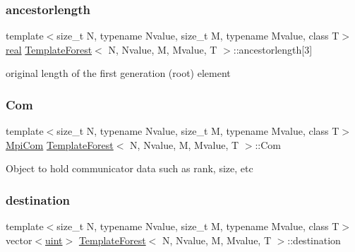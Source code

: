 \subsubsection{\texorpdfstring{ancestorlength}{ancestorlength}}
{\footnotesize\ttfamily template$<$size\+\_\+t N, typename Nvalue, size\+\_\+t M, typename Mvalue, class T$>$ \\
\mbox{\hyperlink{definitions_8h_aedc0ad84d1e764530814f57ad931d02a}{real}} \mbox{\hyperlink{classTemplateForest}{Template\+Forest}}$<$ N, Nvalue, M, Mvalue, T $>$\+::ancestorlength\mbox{[}3\mbox{]}\hspace{0.3cm}{\ttfamily [protected]}}

original length of the first generation (root) element \mbox{\label{classTemplateForest_a98136f14aec33e243ff65b68b89c5fdc}} 
\subsubsection{\texorpdfstring{Com}{Com}}
{\footnotesize\ttfamily template$<$size\+\_\+t N, typename Nvalue, size\+\_\+t M, typename Mvalue, class T$>$ \\
\mbox{\hyperlink{structMpiCom}{Mpi\+Com}} \mbox{\hyperlink{classTemplateForest}{Template\+Forest}}$<$ N, Nvalue, M, Mvalue, T $>$\+::Com\hspace{0.3cm}{\ttfamily [private]}}

Object to hold communicator data such as rank, size, etc \mbox{\label{classTemplateForest_a31344621cbe88d961bdb70174ce8bbc9}} 
\subsubsection{\texorpdfstring{destination}{destination}}
{\footnotesize\ttfamily template$<$size\+\_\+t N, typename Nvalue, size\+\_\+t M, typename Mvalue, class T$>$ \\
vector$<$\mbox{\hyperlink{definitions_8h_a69aa29b598b851b0640aa225a9e5d61d}{uint}}$>$ \mbox{\hyperlink{classTemplateForest}{Template\+Forest}}$<$ N, Nvalue, M, Mvalue, T $>$\+::destination\hspace{0.3cm}{\ttfamily [private]}}

